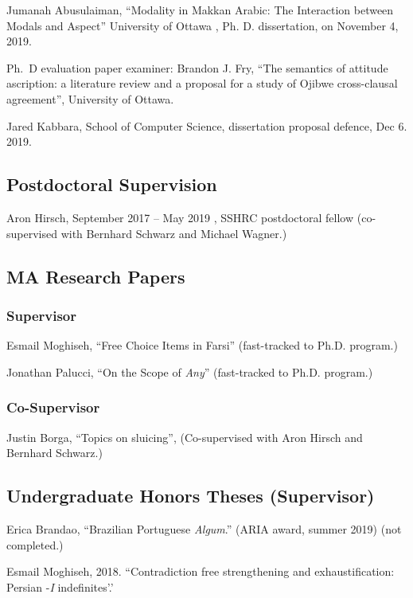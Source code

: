 \documentclass[11pt]{article}
\begin{document}
Jumanah Abusulaiman, “Modality in Makkan Arabic: The Interaction between Modals and Aspect” University of Ottawa , Ph. D. dissertation, on November 4, 2019.

Ph.\ D evaluation paper examiner: Brandon J. Fry, ``The semantics of attitude ascription: a literature review and a proposal for a study of Ojibwe cross-clausal agreement'', University of Ottawa.

Jared Kabbara, School of Computer Science, dissertation proposal defence, Dec 6. 2019.


\subsection*{Postdoctoral Supervision}

Aron Hirsch, September 2017 -- May 2019 , SSHRC postdoctoral fellow (co-supervised with Bernhard Schwarz and Michael Wagner.)

\subsection*{MA Research Papers}

\subsubsection*{Supervisor}

Esmail Moghiseh, ``Free Choice Items in Farsi'' (fast-tracked to Ph.D. program.)

Jonathan Palucci, ``On the Scope of \textit{Any}'' (fast-tracked to Ph.D. program.)

\subsubsection*{Co-Supervisor}

Justin Borga, ``Topics on sluicing'', (Co-supervised with Aron Hirsch and Bernhard Schwarz.)

\subsection*{Undergraduate Honors Theses (Supervisor)}

Erica Brandao, ``Brazilian Portuguese \textit{Algum}.'' (ARIA award, summer 2019) (not completed.)

Esmail Moghiseh, 2018. ``Contradiction free strengthening and exhaustification: Persian -\textit{I} indefinites'.' 
\end{document}
